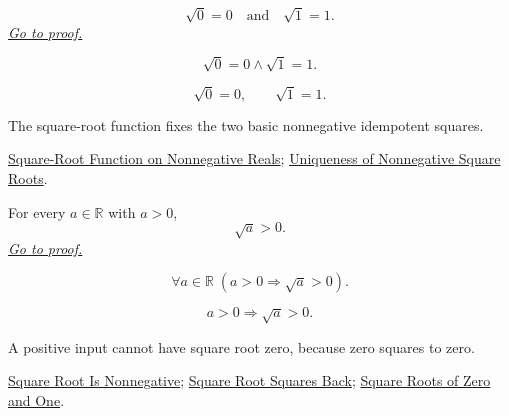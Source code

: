 \begin{theorem}
\label{thm:sqrt-zero-one}
\[
\sqrt{0}=0
\quad\text{and}\quad
\sqrt{1}=1.
\]
\hyperref[prf:sqrt-zero-one]{\textit{Go to proof.}}
\end{theorem}
\begin{remark*}
\[
\sqrt{0}=0\land\sqrt{1}=1.
\]
\end{remark*}
\begin{remark*}
\[
\sqrt{0}=0,\qquad \sqrt{1}=1.
\]
\end{remark*}
\begin{remark*}[Interpretation]
The square-root function fixes the two basic nonnegative idempotent squares.
\end{remark*}
\begin{dependencies}
\hyperref[def:real-square-root-function]{Square-Root Function on Nonnegative Reals};
\hyperref[thm:uniqueness-of-nonnegative-square-roots]{Uniqueness of Nonnegative Square Roots}.
\end{dependencies}

\begin{theorem}
\label{thm:sqrt-positive}
For every $a\in\mathbb{R}$ with $a>0$,
\[
\sqrt a>0.
\]
\hyperref[prf:sqrt-positive]{\textit{Go to proof.}}
\end{theorem}
\begin{remark*}
\[
\forall a\in\mathbb{R}\;(a>0\Rightarrow\sqrt a>0).
\]
\end{remark*}
\begin{remark*}
\[
a>0\Rightarrow\sqrt a>0.
\]
\end{remark*}
\begin{remark*}[Interpretation]
A positive input cannot have square root zero, because zero squares to zero.
\end{remark*}
\begin{dependencies}
\hyperref[thm:sqrt-nonnegative]{Square Root Is Nonnegative};
\hyperref[thm:sqrt-square]{Square Root Squares Back};
\hyperref[thm:sqrt-zero-one]{Square Roots of Zero and One}.
\end{dependencies}

